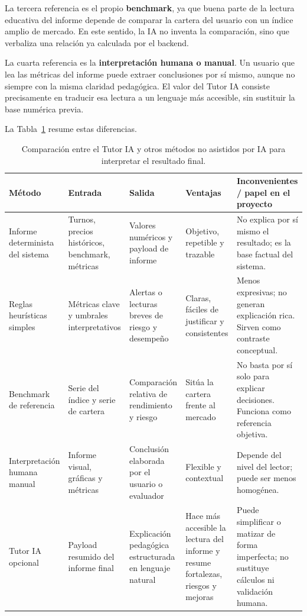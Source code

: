 La tercera referencia es el propio \textbf{benchmark}, ya que buena parte de la lectura educativa del informe depende de comparar la cartera del usuario con un índice amplio de mercado. En este sentido, la IA no inventa la comparación, sino que verbaliza una relación ya calculada por el backend.

La cuarta referencia es la \textbf{interpretación humana o manual}. Un usuario que lea las métricas del informe puede extraer conclusiones por sí mismo, aunque no siempre con la misma claridad pedagógica. El valor del Tutor IA consiste precisamente en traducir esa lectura a un lenguaje más accesible, sin sustituir la base numérica previa.

La Tabla~\ref{tab:comparativa-metodos-tutor-ia} resume estas diferencias.

\begin{table}[htbp]
\centering
\small
\renewcommand{\arraystretch}{1.15}
\begin{tabular}{|p{}|p{}|p{}|p{}|p{}|}
\hline
\textbf{Método} & \textbf{Entrada} & \textbf{Salida} & \textbf{Ventajas} & \textbf{Inconvenientes / papel en el proyecto} \\ \hline
Informe determinista del sistema & Turnos, precios históricos, benchmark, métricas & Valores numéricos y payload de informe & Objetivo, repetible y trazable & No explica por sí mismo el resultado; es la base factual del sistema. \\ \hline
Reglas heurísticas simples & Métricas clave y umbrales interpretativos & Alertas o lecturas breves de riesgo y desempeño & Claras, fáciles de justificar y consistentes & Menos expresivas; no generan explicación rica. Sirven como contraste conceptual. \\ \hline
Benchmark de referencia & Serie del índice y serie de cartera & Comparación relativa de rendimiento y riesgo & Sitúa la cartera frente al mercado & No basta por sí solo para explicar decisiones. Funciona como referencia objetiva. \\ \hline
Interpretación humana manual & Informe visual, gráficas y métricas & Conclusión elaborada por el usuario o evaluador & Flexible y contextual & Depende del nivel del lector; puede ser menos homogénea. \\ \hline
Tutor IA opcional & Payload resumido del informe final & Explicación pedagógica estructurada en lenguaje natural & Hace más accesible la lectura del informe y resume fortalezas, riesgos y mejoras & Puede simplificar o matizar de forma imperfecta; no sustituye cálculos ni validación humana. \\ \hline
\end{tabular}
\caption{Comparación entre el Tutor IA y otros métodos no asistidos por IA para interpretar el resultado final.}
\label{tab:comparativa-metodos-tutor-ia}
\end{table}

